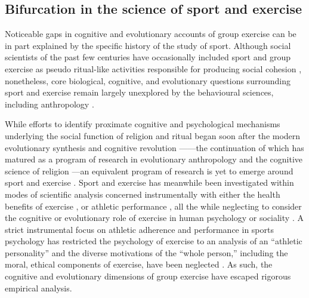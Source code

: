 \begin{CJK}{UTF8}{gbsn}
\subsection{Bifurcation in the science of sport and exercise}

Noticeable gaps in cognitive and evolutionary accounts of group exercise can be in part explained by the specific history of the study of sport.  Although social scientists of the past few centuries have occasionally included sport and group exercise as pseudo ritual-like activities responsible for producing social cohesion \citep{Durkheim1965,Mauss1935,Turner1977}, nonetheless, core biological, cognitive, and evolutionary questions surrounding sport and exercise remain largely unexplored by the behavioural sciences, including anthropology \citep{Blanchard1995,Downey2005a}.

While efforts to identify proximate cognitive and psychological mechanisms underlying the social function of religion and ritual began soon after the modern evolutionary synthesis \citep{Huxley1942} and cognitive revolution \citep[e.g.,][]{Turner1986,1987}—---the continuation of which has matured as a program of research in evolutionary anthropology and the cognitive science of religion \citep{Barrett2002,Lawson1993,Sperber1996,Whitehouse2004}---an equivalent program of research is yet to emerge around sport and exercise \citep{Blanchard1995,Downey2005a}.  Sport and exercise has meanwhile been investigated within modes of scientific analysis concerned instrumentally with either the health benefits of exercise \citep{Fiuza-Luces2013,Morris1994}, or athletic performance \citep{Beedie2015a}, all the while neglecting to consider the cognitive or evolutionary role of exercise in human psychology or sociality \citep{Balish2013,Coulter2015}. A strict instrumental focus on athletic adherence and performance in sports psychology has restricted the psychology of exercise to an analysis of an ``athletic personality'' and the diverse motivations of the ``whole person,'' including the moral, ethical components of exercise, have been neglected \citep{Coulter2015,Laborde2014}.  As such, the cognitive and evolutionary dimensions of group exercise have escaped rigorous empirical analysis.


\end{CJK}
